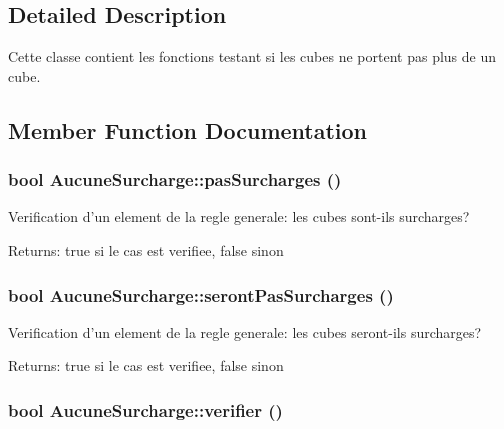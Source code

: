 \subsection{Detailed Description}
Cette classe contient les fonctions testant si les cubes ne portent pas plus de un cube. 

\subsection{Member Function Documentation}
\hypertarget{classAucuneSurcharge_985f14cd31785475866dc1081a41e2e1}{
\subsubsection[{pasSurcharges}]{\setlength{\rightskip}{0pt plus 5cm}bool AucuneSurcharge::pasSurcharges ()}}
\label{classAucuneSurcharge_985f14cd31785475866dc1081a41e2e1}


Verification d'un element de la regle generale: les cubes sont-ils surcharges? 

\begin{Desc}
\item[Returns:]true si le cas est verifiee, false sinon \end{Desc}
\hypertarget{classAucuneSurcharge_a866df9a186c7b922890cf00af2b58e2}{
\subsubsection[{serontPasSurcharges}]{\setlength{\rightskip}{0pt plus 5cm}bool AucuneSurcharge::serontPasSurcharges ()}}
\label{classAucuneSurcharge_a866df9a186c7b922890cf00af2b58e2}


Verification d'un element de la regle generale: les cubes seront-ils surcharges? 

\begin{Desc}
\item[Returns:]true si le cas est verifiee, false sinon \end{Desc}
\hypertarget{classAucuneSurcharge_d96084db10b49f9c48f6cb005248f7c4}{
\subsubsection[{verifier}]{\setlength{\rightskip}{0pt plus 5cm}bool AucuneSurcharge::verifier ()}}
\label{classAucuneSurcharge_d96084db10b49f9c48f6cb005248f7c4}


